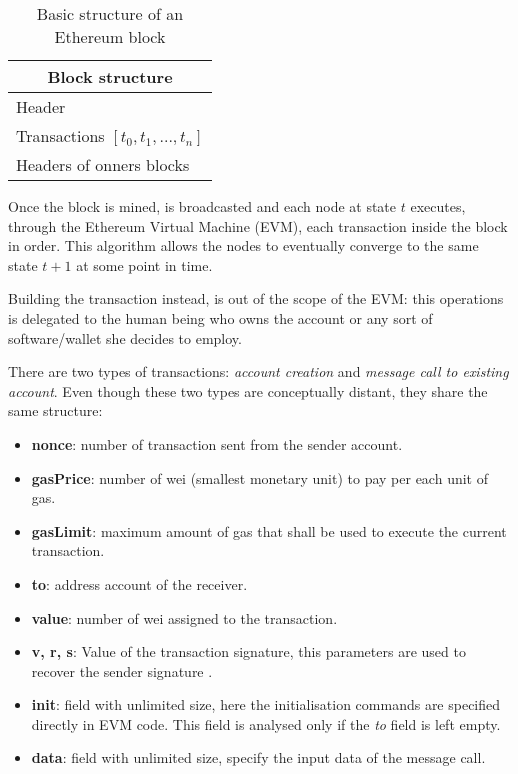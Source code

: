 \begin{table}[h!]
\centering
\begin{tabular}{ |p{3cm}|  }
\hline
\multicolumn{1}{|c|}{Block structure} \\
\hline
\hline
Header \\
\hline
Transactions $[t_0,t_1,...,t_n]$ \\
\hline
Headers of onners blocks\\
\hline
\end{tabular}
\caption{Basic structure of an Ethereum block}
\label{table:2}
\end{table}

Once the block is mined, is broadcasted and each node at state $t$  executes, through the Ethereum Virtual Machine (EVM), each transaction inside the block in order.
This algorithm allows the nodes to eventually converge to the same state $t+1$ at some point in time.

Building the transaction instead, is out of the scope of the EVM: this operations is delegated to the human being who owns the account or any sort of software/wallet she decides to employ.

There are two types of transactions: \textit{account creation} and \textit{message call to existing account}. Even though these two types are conceptually distant, they share the same structure:

\begin{itemize}
  \item \textbf{nonce}: number of transaction sent from the sender account.
  \item \textbf{gasPrice}: number of wei (smallest monetary unit) to pay per each unit of gas.
  \item \textbf{gasLimit}: maximum amount of gas that shall be used to execute the current transaction.
  \item \textbf{to}: address account of the receiver.
  \item \textbf{value}: number of wei assigned to the transaction.
  \item \textbf{v, r, s}: Value of the transaction signature, this parameters are used to recover the sender signature \cite{gura2004comparing}.
  \item \textbf{init}: field with unlimited size, here the initialisation commands are specified directly in EVM code. This field is analysed only if the \textit{to} field is left empty.
  \item \textbf{data}: field with unlimited size, specify the input data of the message call.
\end{itemize}

